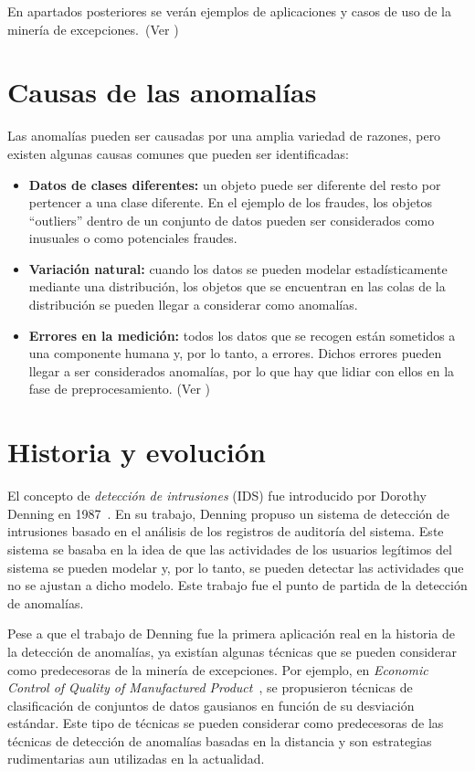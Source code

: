 En apartados posteriores se verán ejemplos de aplicaciones y casos de uso de la minería de
excepciones.~(Ver )

\section{Causas de las anomalías}
Las anomalías pueden ser causadas por una amplia variedad de razones, pero existen algunas
causas comunes que pueden ser identificadas:

\begin{itemize}
	\item \textbf{Datos de clases diferentes:} un objeto puede ser diferente del resto por
		pertencer a una clase diferente. En el ejemplo de los fraudes, los objetos ``outliers''
		dentro de un conjunto de datos pueden ser considerados como inusuales o como potenciales
		fraudes.
	\item \textbf{Variación natural:} cuando los datos se pueden modelar estadísticamente
		mediante una distribución, los objetos que se encuentran en las colas de la distribución
		se pueden llegar a considerar como anomalías.
	\item \textbf{Errores en la medición:} todos los datos que se recogen están sometidos a una
		componente humana y, por lo tanto, a errores. Dichos errores pueden llegar a ser
		considerados anomalías, por lo que hay que lidiar con ellos en la fase de preprocesamiento.
		(Ver )
\end{itemize}

\section{Historia y evolución}\label{sec:hist}
El concepto de \textit{detección de intrusiones} (IDS) fue introducido por Dorothy Denning en
1987~\cite{denning1987intrusion}. En su trabajo, Denning propuso un sistema de detección de intrusiones
basado en el análisis de los registros de auditoría del sistema. Este sistema se basaba en la idea
de que las actividades de los usuarios legítimos del sistema se pueden modelar y, por lo tanto,
se pueden detectar las actividades que no se ajustan a dicho modelo. Este trabajo fue el punto de
partida de la detección de anomalías.

Pese a que el trabajo de Denning fue la primera aplicación real en la historia de la detección de
anomalías, ya existían algunas técnicas que se pueden considerar como predecesoras de la minería
de excepciones. Por ejemplo, en \textit{Economic Control of Quality of
Manufactured Product}~\cite{shewhart1931economic}, se propusieron técnicas de clasificación de
conjuntos de datos gausianos en función de su desviación estándar. Este tipo de técnicas se pueden
considerar como predecesoras de las técnicas de detección de anomalías basadas en la distancia
y son estrategias rudimentarias aun utilizadas en la actualidad.

